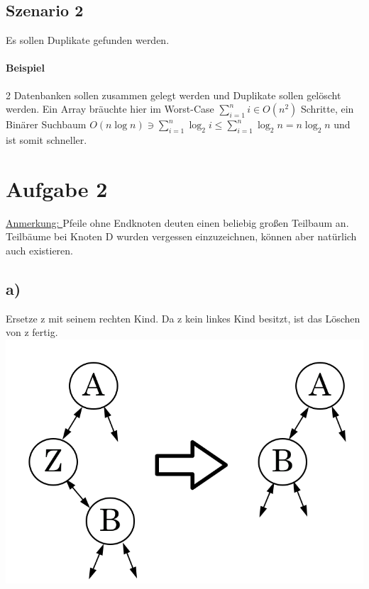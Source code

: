 \documentclass[a4paper,11pt,twoside]{article}
\begin{document}
\subsection*{Szenario 2}
Es sollen Duplikate gefunden werden.\\
\paragraph*{Beispiel} 2 Datenbanken sollen zusammen gelegt werden und Duplikate sollen gelöscht werden. Ein Array bräuchte hier im Worst-Case $\sum_{i=1}^n i \in O(n^2)$ Schritte, ein Binärer Suchbaum $O(n \log n)\ni\sum_{i=1}^n\log_2 i \leq \sum_{i=1}^n\log_2 n = n \log_2 n$ und ist somit schneller.
\pagebreak
\section*{Aufgabe 2}
\underline{Anmerkung: } Pfeile ohne Endknoten deuten einen beliebig großen Teilbaum an. Teilbäume bei Knoten D wurden vergessen einzuzeichnen, können aber natürlich auch existieren.
\subsection*{a)} Ersetze z mit seinem rechten Kind. Da z kein linkes Kind besitzt, ist das Löschen von z fertig.\\
\includegraphics*[scale=0.2]{Images/A.png}
\end{document}
